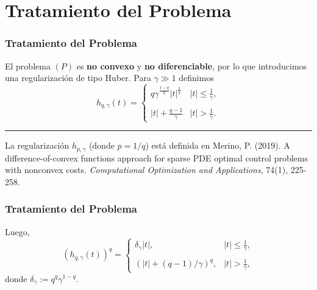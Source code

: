 \documentclass{beamer}
\begin{document}
\section{Tratamiento del Problema}
\begin{frame}
\frametitle{Tratamiento del Problema}
El problema $(P)$ es \textbf{no convexo} y \textbf{no diferenciable}, por lo que introducimos una regularización de tipo Huber. Para $\gamma\gg1$ definimos
\begin{equation*}
    h_{q,\gamma}(t) = \left\{\begin{array}{ll}
        q\gamma^{\frac{1-q}{q}}|t|^{\frac{1}{q}} & |t|\leq \frac{1}{\gamma}, \\ \\
        |t|+\frac{q-1}{\gamma}                   & |t|>\frac{1}{\gamma}.
    \end{array}\right.
\end{equation*}

\rule{\linewidth}{0.4pt} %
{\tiny
La regularización $h_{p,\gamma}$ (donde $p=1/q$) está definida en Merino, P. (2019). A difference-of-convex functions approach for sparse PDE optimal control problems with nonconvex costs. \textit{Computational Optimization and Applications}, 74(1), 225-258.
}
\end{frame}
\justify
\begin{frame}
\frametitle{Tratamiento del Problema}
Luego, 
    \begin{equation*}
        (h_{q,\gamma}(t))^q = \left\{\begin{array}{ll}
           \delta_{\gamma}|t|, & |t|\leq \frac{1}{\gamma},\\\\
           \left(|t|+(q-1)/\gamma\right)^q, & |t|>\frac{1}{\gamma},
            \end{array}\right.
    \end{equation*}
donde $\delta_{\gamma}:=q^q\gamma^{1-q}$.
\end{frame}
\end{document}

